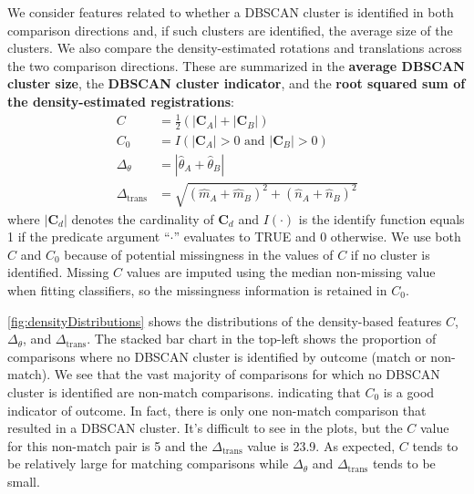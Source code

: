 \documentclass[
]{jdssv}
\begin{document}
We consider features related to whether a DBSCAN cluster is identified
in both comparison directions and, if such clusters are identified, the
average size of the clusters. We also compare the density-estimated
rotations and translations across the two comparison directions. These
are summarized in the \textbf{average DBSCAN cluster size}, the
\textbf{DBSCAN cluster indicator}, and the
\textbf{root squared sum of the density-estimated registrations}:
\begin{align*}
C &= \frac{1}{2}\left(|\pmb{C}_A| + |\pmb{C}_B|\right) \\
C_0 &= I(|\pmb{C}_A| > 0 \text{ and } |\pmb{C}_B| > 0)\\
\Delta_\theta &= |\hat{\theta}_A + \hat{\theta}_B| \\
\Delta_{\text{trans}} &= \sqrt{(\hat{m}_A + \hat{m}_B)^2 + (\hat{n}_A + \hat{n}_B)^2}
\end{align*} where \(|\pmb{C}_d|\) denotes the cardinality of
\(\pmb{C}_d\) and \(I(\cdot)\) is the identify function equals 1 if the
predicate argument ``\(\cdot\)'' evaluates to TRUE and 0 otherwise. We
use both \(C\) and \(C_0\) because of potential missingness in the
values of \(C\) if no cluster is identified. Missing \(C\) values are
imputed using the median non-missing value when fitting classifiers, so
the missingness information is retained in \(C_0\).

\autoref{fig:densityDistributions} shows the distributions of the
density-based features \(C\), \(\Delta_\theta\), and
\(\Delta_{\text{trans}}\). The stacked bar chart in the top-left shows
the proportion of comparisons where no DBSCAN cluster is identified by
outcome (match or non-match). We see that the vast majority of
comparisons for which no DBSCAN cluster is identified are non-match
comparisons. indicating that \(C_0\) is a good indicator of outcome. In
fact, there is only one non-match comparison that resulted in a DBSCAN
cluster. It's difficult to see in the plots, but the \(C\) value for
this non-match pair is 5 and the \(\Delta_{\text{trans}}\) value is
23.9. As expected, \(C\) tends to be relatively large for matching
comparisons while \(\Delta_{\theta}\) and \(\Delta_{\text{trans}}\)
tends to be small.
\end{document}
